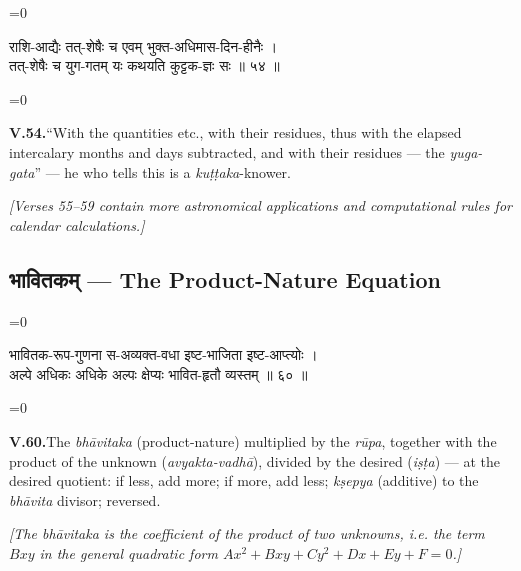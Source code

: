 \documentclass[11pt,a4paper]{article}
\newcommand{\cnote}[1]{\textcolor{notecolor}{\textit{#1}}}
\newcommand{\dev}[1]{{\devanagarifont\color{sktcolor}#1}}
\newcommand{\iast}[1]{\textit{#1}}
\newenvironment{paracol}[1]{\begingroup}{\endgroup}
\newcommand{\switchcolumn}[1][]{%
  \ifnum#1=0\relax\else\par\nobreak\vspace{0.5em}\par\nobreak\fi%
}
\begin{document}
\vspace{0.3cm}

\begin{paracol}{2}
\switchcolumn[0]
\dev{%
राशि-आद्यैः तत्-शेषैः च एवम् भुक्त-अधिमास-दिन-हीनैः ।\\
तत्-शेषैः च युग-गतम् यः कथयति कुट्टक-ज्ञः सः ॥ ५४ ॥
}

\switchcolumn[1]
\textbf{V.54.}\quad ``With the quantities etc., with their residues,
thus with the elapsed intercalary months and days subtracted, and
with their residues — the \iast{yuga-gata}'' — he who tells this is
a \iast{kuṭṭaka}-knower.
\end{paracol}

\vspace{0.5cm}
\cnote{[Verses 55–59 contain more astronomical applications and
computational rules for calendar calculations.]}

\newpage

\subsection*{\dev{भावितकम् — The Product-Nature Equation}}

\vspace{0.3cm}

\begin{paracol}{2}
\switchcolumn[0]
\dev{%
भावितक-रूप-गुणना स-अव्यक्त-वधा इष्ट-भाजिता इष्ट-आप्त्योः ।\\
अल्पे अधिकः अधिके अल्पः क्षेप्यः भावित-हृतौ व्यस्तम् ॥ ६० ॥
}

\switchcolumn[1]
\textbf{V.60.}\quad The \iast{bhāvitaka} (product-nature) multiplied
by the \iast{rūpa}, together with the product of the unknown
(\iast{avyakta-vadhā}), divided by the desired (\iast{iṣṭa}) — at
the desired quotient: if less, add more; if more, add less;
\iast{kṣepya} (additive) to the \iast{bhāvita} divisor; reversed.

\medskip
\textit{[The \iast{bhāvitaka} is the coefficient of the product of
two unknowns, i.e. the term $Bxy$ in the general quadratic form
$Ax^2 + Bxy + Cy^2 + Dx + Ey + F = 0$.]}
\end{paracol}

\vspace{0.3cm}
\end{document}
